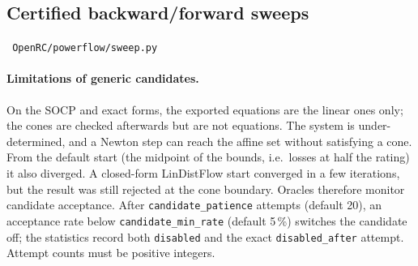 \documentclass[11pt,a4paper]{report}
\newcommand{\code}[1]{\texttt{\small #1}}
\newcommand{\file}[1]{\texttt{\small\color{nbgrey} #1}}
\begin{document}
\subsection{Certified backward/forward sweeps}
\label{sec:sweep}

\file{OpenRC/powerflow/sweep.py}

\paragraph{Limitations of generic candidates.} On the SOCP and exact forms, the
exported equations are the linear ones only; the cones are checked
afterwards but are not equations. The system is under-determined, and a
Newton step can reach the affine set without satisfying a cone. From the default
start (the midpoint of the bounds, i.e.\ losses at half the rating) it also
diverged. A closed-form
LinDistFlow start converged in a few iterations, but the result was still rejected
at the cone boundary. Oracles therefore monitor candidate acceptance. After
\code{candidate\_patience} attempts (default 20), an acceptance rate below
\code{candidate\_min\_rate} (default 5\,\%) switches the candidate off; the
statistics record both \code{disabled} and the exact \code{disabled\_after}
attempt. Attempt counts must be positive integers.
\end{document}
